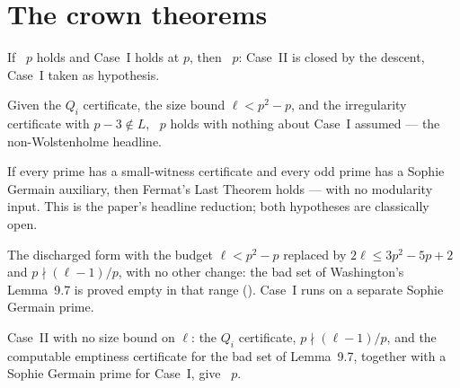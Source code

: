 \section{The crown theorems}\label{sec:crown}

\begin{theorem}\label{thm:fltvandiver}
  \leanok
  If ~$p$ holds and Case~I holds at $p$, then
  ~$p$: Case~II is closed by the descent, Case~I taken
  as hypothesis.
\end{theorem}

\begin{theorem}\label{thm:certs95}
  \leanok
  Given the $Q_i$ certificate, the size bound $\ell < p^2-p$, and the irregularity
  certificate with $p-3 \notin L$, ~$p$ holds with nothing
  about Case~I assumed --- the non-Wolstenholme headline.
\end{theorem}

\begin{theorem}\label{thm:crown}
  \leanok
  If every prime has a small-witness certificate and every odd prime has a Sophie
  Germain auxiliary, then Fermat's Last Theorem holds --- with no modularity input.
  This is the paper's headline reduction; both hypotheses are classically open.
\end{theorem}

\begin{theorem}\label{thm:sizecert}
  \leanok
  The discharged form with the budget $\ell < p^2 - p$ replaced by
  $2\ell \le 3p^2 - 5p + 2$ and $p \nmid (\ell-1)/p$, with no other change: the bad set
  of Washington's Lemma~9.7 is proved empty in that range
  (). Case~I runs on a separate Sophie Germain prime.
\end{theorem}

\begin{theorem}\label{thm:badcert}
  \leanok
  Case~II with no size bound on $\ell$: the $Q_i$ certificate, $p \nmid (\ell-1)/p$, and
  the computable emptiness certificate  for the bad set of Lemma~9.7,
  together with a Sophie Germain prime for Case~I, give
  ~$p$.
\end{theorem}

